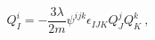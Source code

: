 \begin{equation}\label{ftermg2}
Q^i_I = -\frac{3 \lambda}{2 m} \psi^{ijk} \epsilon_{IJK} Q^j_J Q^k_K ~,
\end{equation}

